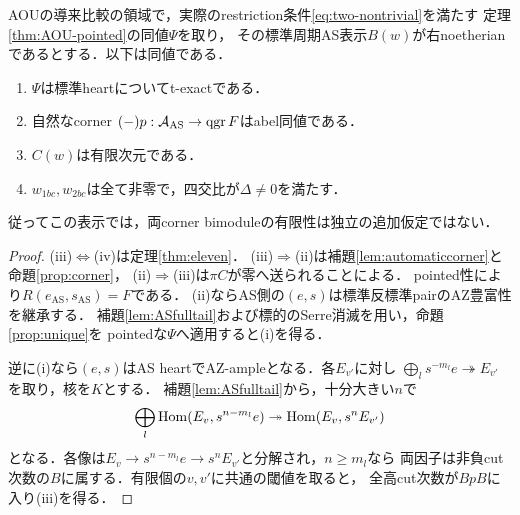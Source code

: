 \begin{theorem}[指定AOU比較の明示的な必要十分条件]\label{thm:AOUexactlocus}
AOUの導来比較の領域で，実際のrestriction条件\eqref{eq:two-nontrivial}を満たす
定理\ref{thm:AOU-pointed}の同値$\Psi$を取り，
その標準周期AS表示$B(w)$が右noetherianであるとする．以下は同値である．
\begin{enumerate}
\item $\Psi$は標準heartについてt-exactである．
\item 自然なcorner $(-)p:\mathcal A_{\mathrm{AS}}\to\operatorname{qgr} F$はabel同値である．
\item $C(w)$は有限次元である．
\item $w_{1bc},w_{2bc}$は全て非零で，四交比が$\Delta\ne0$を満たす．
\end{enumerate}
従ってこの表示では，両corner bimoduleの有限性は独立の追加仮定ではない．
\end{theorem}
\begin{proof}
(iii)$\Leftrightarrow$(iv)は定理\ref{thm:eleven}．
(iii)$\Rightarrow$(ii)は補題\ref{lem:automaticcorner}と命題\ref{prop:corner}，
(ii)$\Rightarrow$(iii)は$\pi C$が零へ送られることによる．
pointed性により$R(e_{\mathrm{AS}},s_{\mathrm{AS}})=F$である．
(ii)ならAS側の$(e,s)$は標準反標準pairのAZ豊富性を継承する．
補題\ref{lem:ASfulltail}および標的のSerre消滅を用い，命題\ref{prop:unique}を
pointedな$\Psi$へ適用すると(i)を得る．

逆に(i)なら$(e,s)$はAS heartでAZ-ampleとなる．各$E_{v'}$に対し
$\bigoplus_l s^{-m_l}e\twoheadrightarrow E_{v'}$を取り，核を$K$とする．
補題\ref{lem:ASfulltail}から，十分大きい$n$で
\[
 \bigoplus_l\operatorname{Hom}(E_v,s^{n-m_l}e)\twoheadrightarrow\operatorname{Hom}(E_v,s^nE_{v'})
\]
となる．各像は$E_v\to s^{n-m_l}e\to s^nE_{v'}$と分解され，$n\ge m_l$なら
両因子は非負cut次数の$B$に属する．有限個の$v,v'$に共通の閾値を取ると，
全高cut次数が$BpB$に入り(iii)を得る．
\end{proof}


